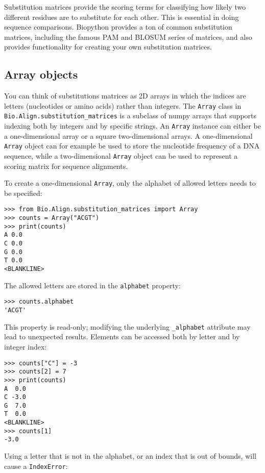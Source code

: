 Substitution matrices \cite{durbin1998} provide the scoring terms for classifying how likely two different residues are to substitute for each other. This is essential in doing sequence comparisons.  Biopython provides a ton of common substitution matrices, including the famous PAM and BLOSUM series of matrices, and also provides functionality for creating your own substitution matrices.

\subsection{Array objects}

You can think of substitutions matrices as 2D arrays in which the indices are letters (nucleotides or amino acids) rather than integers.  The \verb+Array+ class in \verb+Bio.Align.substitution_matrices+ is a subclass of numpy arrays that supports indexing both by integers and by specific strings. An \verb+Array+ instance can either be a one-dimensional array or a square two-dimensional arrays. A one-dimensional \verb+Array+ object can for example be used to store the nucleotide frequency of a DNA sequence, while a two-dimensional \verb+Array+ object can be used to represent a scoring matrix for sequence alignments.

To create a one-dimensional \verb+Array+, only the alphabet of allowed letters needs to be specified:

\begin{verbatim}
>>> from Bio.Align.substitution_matrices import Array
>>> counts = Array("ACGT")
>>> print(counts)
A 0.0
C 0.0
G 0.0
T 0.0
<BLANKLINE>
\end{verbatim}
The allowed letters are stored in the \verb+alphabet+ property:

\begin{verbatim}
>>> counts.alphabet
'ACGT'
\end{verbatim}
This property is read-only; modifying the underlying \verb+_alphabet+ attribute may lead to unexpected results.
Elements can be accessed both by letter and by integer index:

\begin{verbatim}
>>> counts["C"] = -3
>>> counts[2] = 7
>>> print(counts)
A  0.0
C -3.0
G  7.0
T  0.0
<BLANKLINE>
>>> counts[1]
-3.0
\end{verbatim}

Using a letter that is not in the alphabet, or an index that is out of bounds, will cause a \verb+IndexError+:


